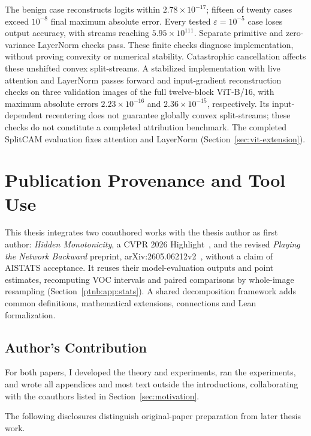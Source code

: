 The benign case reconstructs logits within $2.78\times10^{-17}$; fifteen of twenty cases exceed $10^{-8}$ final maximum absolute error. Every tested $\varepsilon=10^{-5}$ case loses output accuracy, with streams reaching $5.95\times10^{111}$. Separate primitive and zero-variance LayerNorm checks pass. These finite checks diagnose implementation, without proving convexity or numerical stability. Catastrophic cancellation affects these unshifted convex split-streams. A stabilized implementation with live attention and LayerNorm passes forward and input-gradient reconstruction checks on three validation images of the full twelve-block ViT-B/16, with maximum absolute errors $2.23\times10^{-16}$ and $2.36\times10^{-15}$, respectively. Its input-dependent recentering does not guarantee globally convex split-streams; these checks do not constitute a completed attribution benchmark. The completed SplitCAM evaluation fixes attention and LayerNorm (Section~\ref{sec:vit-extension}).



\chapter{Publication Provenance and Tool Use}\label{app:publication_provenance}

This thesis integrates two coauthored works with the thesis author as first author: \emph{Hidden Monotonicity}, a CVPR 2026 Highlight~\parencite{hiddenMono}, and the revised \emph{Playing the Network Backward} preprint, arXiv:2605.06212v2~\parencite{playingBackward2026}, without a claim of AISTATS acceptance. It reuses their model-evaluation outputs and point estimates, recomputing VOC intervals and paired comparisons by whole-image resampling (Section~\ref{ptnb:app:stats}). A shared decomposition framework adds common definitions, mathematical extensions, connections and Lean formalization.

\section{Author's Contribution}\label{app:author_contribution}

For both papers, I developed the theory and experiments, ran the experiments, and wrote all appendices and most text outside the introductions, collaborating with the coauthors listed in Section~\ref{sec:motivation}.

The following disclosures distinguish original-paper preparation from later thesis work.

